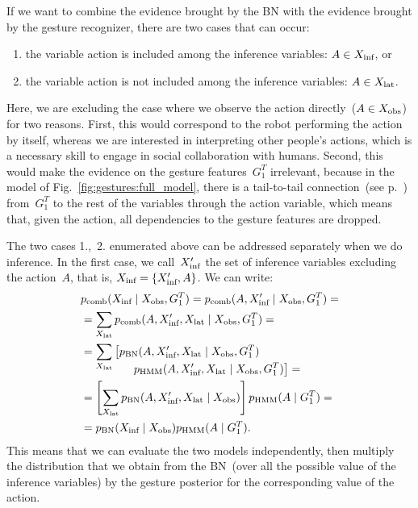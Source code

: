 If we want to combine the evidence brought by the \ac{BN} with the evidence brought by the gesture recognizer, there are two cases that can occur:
\begin{enumerate}
\item the variable action is included among the inference variables: $A \in X_\text{inf}$, or

\item the variable action is not included among the inference variables: $A \in X_\text{lat}$.
\end{enumerate}

Here, we are excluding the case where we observe the action directly~($A \in X_\text{obs}$) for two reasons.
First, this would correspond to the robot performing the action by itself, whereas we are interested in interpreting other people's actions, which is a necessary skill to engage in social collaboration with humans.
Second, this would make the evidence on the gesture features~$G_1^T$ irrelevant, because in the model of Fig.~\ref{fig:gestures:full_model}, there is a tail-to-tail connection~(see p.~\pageref{tail_to_tail}) from~$G_1^T$ to the rest of the variables through the action variable, which means that, given the action, all dependencies to the gesture features are dropped.

The two cases 1.,~2. enumerated above can be addressed separately when we do inference.
In the first case, we call~$X_\text{inf}^\prime$ the set of inference variables excluding the action~$A$, that is, $X_\text{inf} = \{X_\text{inf}^\prime, A\}$.
We can write:
\begin{align} \label{eq:pcomb_inf_includes_action}
  & p_\text{comb}(X_\text{inf} \mid  X_\text{obs}, G_1^T) = p_\text{comb}(A, X_\text{inf}^\prime \mid  X_\text{obs}, G_1^T)= \nonumber \\
  &= \sum_{X_\text{lat}} p_\text{comb}(A, X_\text{inf}^\prime, X_\text{lat} \mid X_\text{obs}, G_1^T)= \nonumber\\
  &= \sum_{X_\text{lat}} \left[p_{\text{BN}}(A, X_\text{inf}^\prime, X_\text{lat} \mid X_\text{obs}, G_1^T)\right. \nonumber \\[-4mm]
    & \mspace{80mu} \left.p_{\text{HMM}}(A, X_\text{inf}^\prime, X_\text{lat} \mid X_\text{obs}, G_1^T)\right]= \nonumber \\
  &= \left[\sum_{X_\text{lat}} p_{\text{BN}}(A, X_\text{inf}^\prime, X_\text{lat} \mid X_\text{obs})\right] p_{\text{HMM}}(A \mid G_1^T)= \nonumber \\
  &= p_{\text{BN}}(X_\text{inf} \mid X_\text{obs}) p_{\text{HMM}}(A \mid G_1^T).
\end{align}
This means that we can evaluate the two models independently, then multiply the distribution that we obtain from the \ac{BN}~(over all the possible value of the inference variables) by the gesture posterior for the corresponding value of the action.

